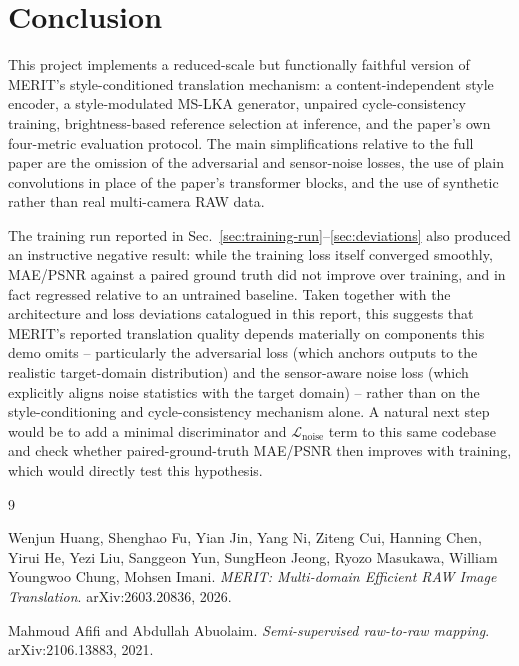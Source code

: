 \documentclass[11pt]{article}
\begin{document}
\section{Conclusion}

This project implements a reduced-scale but functionally faithful
version of MERIT's style-conditioned translation mechanism: a
content-independent style encoder, a style-modulated MS-LKA generator,
unpaired cycle-consistency training, brightness-based reference
selection at inference, and the paper's own four-metric evaluation
protocol. The main simplifications relative to the full paper are the
omission of the adversarial and sensor-noise losses, the use of plain
convolutions in place of the paper's transformer blocks, and the use of
synthetic rather than real multi-camera RAW data.

The training run reported in Sec.~\ref{sec:training-run}--\ref{sec:deviations}
also produced an instructive negative result: while the training loss
itself converged smoothly, MAE/PSNR against a paired ground truth did
not improve over training, and in fact regressed relative to an
untrained baseline. Taken together with the architecture and loss
deviations catalogued in this report, this suggests that MERIT's
reported translation quality depends materially on components this demo
omits -- particularly the adversarial loss (which anchors outputs to
the realistic target-domain distribution) and the sensor-aware noise
loss (which explicitly aligns noise statistics with the target domain)
-- rather than on the style-conditioning and cycle-consistency mechanism
alone. A natural next step would be to add a minimal discriminator and
$\mathcal{L}_{\text{noise}}$ term to this same codebase and check
whether paired-ground-truth MAE/PSNR then improves with training, which
would directly test this hypothesis.


\begin{thebibliography}{9}

Wenjun Huang, Shenghao Fu, Yian Jin, Yang Ni, Ziteng Cui, Hanning Chen,
Yirui He, Yezi Liu, Sanggeon Yun, SungHeon Jeong, Ryozo Masukawa,
William Youngwoo Chung, Mohsen Imani.
\emph{MERIT: Multi-domain Efficient RAW Image Translation}.
arXiv:2603.20836, 2026.

Mahmoud Afifi and Abdullah Abuolaim.
\emph{Semi-supervised raw-to-raw mapping}.
arXiv:2106.13883, 2021.

\end{thebibliography}
\end{document}
